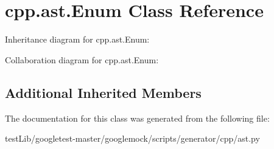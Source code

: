 \hypertarget{classcpp_1_1ast_1_1Enum}{}\section{cpp.\+ast.\+Enum Class Reference}
\label{classcpp_1_1ast_1_1Enum}


Inheritance diagram for cpp.\+ast.\+Enum\+:


Collaboration diagram for cpp.\+ast.\+Enum\+:
\subsection*{Additional Inherited Members}


The documentation for this class was generated from the following file\+:\begin{DoxyCompactItemize}
\item 
test\+Lib/googletest-\/master/googlemock/scripts/generator/cpp/ast.\+py\end{DoxyCompactItemize}
